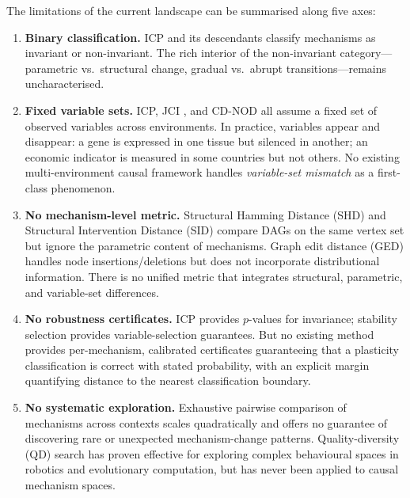 \documentclass[11pt,a4paper]{article}
\theoremstyle{definition}
\begin{document}
The limitations of the current landscape can be summarised along five axes:
\begin{enumerate}[label=(\roman*)]
  \item \textbf{Binary classification.}
    ICP \citep{peters2016causal} and its descendants classify mechanisms as
    invariant or non-invariant.  The rich interior of the non-invariant
    category---parametric vs.\ structural change, gradual vs.\ abrupt
    transitions---remains uncharacterised.

  \item \textbf{Fixed variable sets.}
    ICP, JCI \citep{mooij2020joint}, and CD-NOD \citep{huang2020causal}
    all assume a fixed set of observed variables across environments.  In
    practice, variables appear and disappear: a gene is expressed in one
    tissue but silenced in another; an economic indicator is measured in
    some countries but not others.  No existing multi-environment causal
    framework handles \emph{variable-set mismatch} as a first-class
    phenomenon.

  \item \textbf{No mechanism-level metric.}
    Structural Hamming Distance (SHD) and Structural Intervention Distance
    (SID) \citep{peters2015structural} compare DAGs on the same vertex set
    but ignore the parametric content of mechanisms.  Graph edit distance
    (GED) \citep{gao2010survey,bougleux2017graph} handles node
    insertions/deletions but does not incorporate distributional
    information.  There is no unified metric that integrates structural,
    parametric, and variable-set differences.

  \item \textbf{No robustness certificates.}
    ICP provides $p$-values for invariance; stability selection
    \citep{meinshausen2010stability} provides variable-selection
    guarantees.  But no existing method provides per-mechanism, calibrated
    certificates guaranteeing that a plasticity classification is correct
    with stated probability, with an explicit margin quantifying distance
    to the nearest classification boundary.

  \item \textbf{No systematic exploration.}
    Exhaustive pairwise comparison of mechanisms across contexts scales
    quadratically and offers no guarantee of discovering rare or unexpected
    mechanism-change patterns.  Quality-diversity (QD) search
    \citep{mouret2015illuminating,vassiliades2018using} has proven
    effective for exploring complex behavioural spaces in robotics and
    evolutionary computation, but has never been applied to causal
    mechanism spaces.
\end{enumerate}
\end{document}
